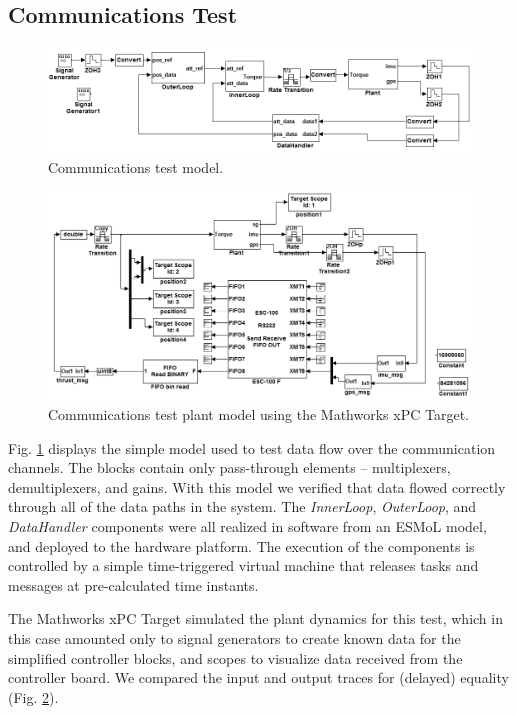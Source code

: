\subsection{Communications Test}

\begin{figure}
\centering
\includegraphics[width=0.9\columnwidth]{figures/comms_test.png}
    \caption{Communications test model.}
    \label{fig:comms_test_mdl}
\end{figure}

\begin{figure}
\centering
\includegraphics[width=0.9\columnwidth]{figures/comms_test_xpc.png}
    \caption{Communications test plant model using the Mathworks xPC Target.}
    \label{fig:comms_test_plant}
\end{figure}

Fig. \ref{fig:comms_test_mdl} displays the simple model used to 
test data flow over the communication channels.  The blocks contain only
pass-through elements -- multiplexers, demultiplexers, and gains.  
With this model we verified that data flowed correctly through all of the
data paths in the system.  The \emph{InnerLoop}, \emph{OuterLoop},
and \emph{DataHandler} components were all realized in software from an
ESMoL model, and deployed to the hardware platform.  
The execution of the components is controlled by a simple time-triggered virtual machine that releases tasks and messages at pre-calculated time instants. 

The Mathworks xPC Target simulated the plant dynamics for this
test, which in this case amounted only to signal generators to create known
data for the simplified controller blocks, and scopes to visualize data received from the controller board.  We compared the input and output traces for
(delayed) equality (Fig. \ref{fig:comms_test_plant}).

